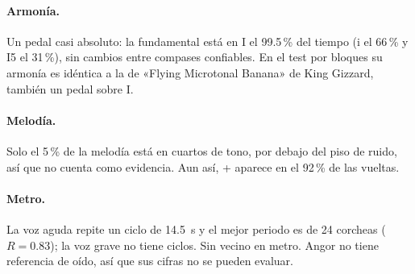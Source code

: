 \paragraph{Armonía.} Un pedal casi absoluto: la fundamental está en I el 99.5\,\% del tiempo (i el 66\,\% y I5 el 31\,\%), sin
cambios entre compases confiables. En el test por bloques su armonía es idéntica a la de «Flying Microtonal Banana» de King
Gizzard, también un pedal sobre I.

\paragraph{Melodía.} Solo el 5\,\% de la melodía está en cuartos de tono, por debajo del piso de ruido, así que no cuenta
como evidencia. Aun así, + aparece en el 92\,\% de las vueltas.

\paragraph{Metro.} La voz aguda repite un ciclo de 14.5~s y el mejor periodo es de 24 corcheas ($R = 0.83$); la voz grave no
tiene ciclos. Sin vecino en metro. Angor no tiene referencia de oído, así que sus cifras no se pueden evaluar.
